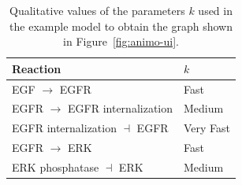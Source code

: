 \documentclass[submission,copyright,creativecommons]{eptcs}
\begin{document}
\begin{table}
\centering
\small
\begin{tabular}{|l|l|}
\hline
 Reaction & $k$ \\
\hline
\hline
EGF $\rightarrow$ EGFR & Fast \\
EGFR $\rightarrow$ EGFR internalization & Medium \\
EGFR internalization $\dashv$ EGFR & Very Fast \\
EGFR $\rightarrow$ ERK & Fast \\
ERK phosphatase $\dashv$ ERK & Medium\\
\hline
\end{tabular}
\caption{Qualitative values of the parameters $k$ used in the example model to obtain the graph shown in Figure~\ref{fig:animo-ui}.\label{tab:parameters}}
\end{table}

\end{document}
